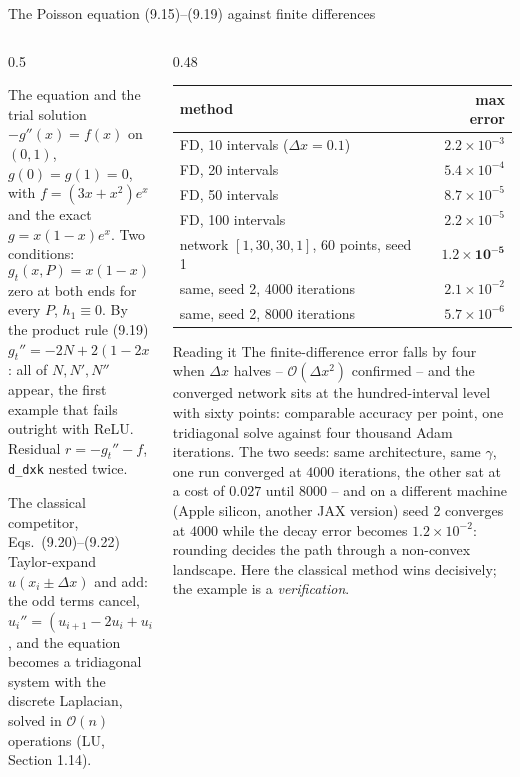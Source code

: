 \documentclass[10pt,aspectratio=169]{beamer}
\begin{document}
\begin{frame}{The Poisson equation (9.15)--(9.19) against finite differences}
\small
\begin{columns}[T]
\begin{column}{0.5\textwidth}
\begin{block}{The equation and the trial solution}
\scriptsize
$-g''(x)=f(x)$ on $(0,1)$, $g(0)=g(1)=0$, with $f=(3x+x^{2})e^{x}$ and the
exact $g=x(1-x)e^{x}$.  Two conditions:
\[
  g_t(x,P)=x(1-x)\,N(x,P)\quad(9.18),
\]
zero at both ends for every $P$, $h_1\equiv0$.  By the product rule (9.19)
$g_t''=-2N+2(1-2x)N'+x(1-x)N''$: all of $N,N',N''$ appear, the first example
that fails outright with ReLU.  Residual $r=-g_t''-f$, \texttt{d\_dxk}
nested twice.
\end{block}
\begin{block}{The classical competitor, Eqs.~(9.20)--(9.22)}
\scriptsize
Taylor-expand $u(x_i\pm\Delta x)$ and add: the odd terms cancel,
$u_i''=(u_{i+1}-2u_i+u_{i-1})/\Delta x^{2}+\mathcal{O}(\Delta x^{2})$, and
the equation becomes a tridiagonal system with the discrete Laplacian,
solved in $\mathcal{O}(n)$ operations (LU, Section 1.14).
\end{block}
\end{column}
\begin{column}{0.48\textwidth}
\begin{center}
\scriptsize
\begin{tabular}{@{}lr@{}}
\toprule
method & max error\\
\midrule
FD, 10 intervals ($\Delta x=0.1$) & $2.2\times10^{-3}$\\
FD, 20 intervals & $5.4\times10^{-4}$\\
FD, 50 intervals & $8.7\times10^{-5}$\\
FD, 100 intervals & $2.2\times10^{-5}$\\
network $[1,30,30,1]$, 60 points, seed 1 & $\mathbf{1.2\times10^{-5}}$\\
same, seed 2, 4000 iterations & $2.1\times10^{-2}$\\
same, seed 2, 8000 iterations & $5.7\times10^{-6}$\\
\bottomrule
\end{tabular}
\end{center}
\begin{block}{Reading it}
\scriptsize
The finite-difference error falls by four when $\Delta x$ halves --
$\mathcal{O}(\Delta x^{2})$ confirmed -- and the converged network sits at
the hundred-interval level with sixty points: comparable accuracy per
point, one tridiagonal solve against four thousand Adam iterations.  The
two seeds: same architecture, same $\gamma$, one run converged at $4000$
iterations, the other sat at a cost of $0.027$ until $8000$ -- and on a
different machine (Apple silicon, another JAX version) seed 2 converges at
$4000$ while the decay error becomes $1.2\times10^{-2}$: rounding decides
the path through a non-convex landscape.  Here the classical method wins
decisively; the example is a \emph{verification}.
\end{block}
\end{column}
\end{columns}
\end{frame}
\end{document}
